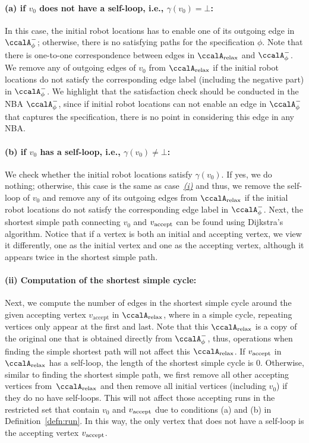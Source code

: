 \documentclass[Afour,sageh,times]{sagej}
\newcommand{\auto}[1]{\ccalA_{\textup{#1}}}
\newcommand{\autop}{\ccalA_{\phi}}
\newcommand{\vertex}[1]{v_{\textup{#1}}}
\begin{document}
{\paragraph{\quad (a) if $v_0$ does not have a self-loop, i.e., $\gamma(v_0)=\bot$:}\label{sec:initial} In this case,  the initial robot locations has to enable one of its outgoing edge in $\autop^-$; otherwise, there is no satisfying paths for the specification $\phi$. Note that there is one-to-one correspondence between edges in $\auto{relax}$ and $\autop^-$. We remove any of outgoing edges of $v_0$ from $\auto{relax}$ if the initial robot locations do not satisfy the corresponding edge label (including the negative part) in $\autop^-$. We highlight that the satisfaction check should be conducted in the NBA $\autop^-$, since if initial robot locations can not enable an edge in $\autop^-$ that captures the specification, there is no point in considering this edge in any NBA.
\paragraph{\quad (b) if $v_0$ has a self-loop, i.e., $\gamma(v_0)\neq\bot$:} We check whether the initial robot locations satisfy $\gamma(v_0)$. If yes, we do nothing; otherwise, this case is the  same as case~\hyperref[sec:initial]{\it (i)} and thus, we remove the self-loop of $v_0$ and
remove any of its  outgoing edges  from $\auto{relax}$ if the initial robot locations do not satisfy the corresponding edge label in $\autop^-$. Next, the shortest simple path connecting $v_0$ and $\vertex{accept}$ can be found using Dijkstra's algorithm.  Notice that if a vertex is both an initial and accepting vertex, we view it differently, one as the initial vertex and one as the accepting vertex, although it appears twice in the shortest simple path.
\paragraph{(ii) Computation of the shortest simple cycle:} Next, we compute the number of edges in the shortest simple cycle around the given accepting vertex $v_\text{accept}$ in $\auto{relax}$, where in a simple cycle, repeating vertices only appear at the first and last. Note that this $\auto{relax}$ is a copy of the original one that is obtained directly from $\autop^-$, thus, operations when finding the simple shortest path will not affect this $\auto{relax}$. If $\vertex{accept}$ in $\auto{relax}$ has a self-loop, the length of the shortest simple cycle is 0. Otherwise, similar to finding the shortest simple path, we first remove all other accepting vertices from~$\auto{relax}$ and then remove all initial vertices (including $v_0$) if they do no have self-loops. This will not affect those accepting runs in the restricted set that contain $v_0$ and $\vertex{accept}$  due to conditions (a) and (b) in Definition~\ref{defn:run}.
  In this way, the only vertex that does not have a self-loop is the accepting vertex $\vertex{accept}$.

}
\end{document}
